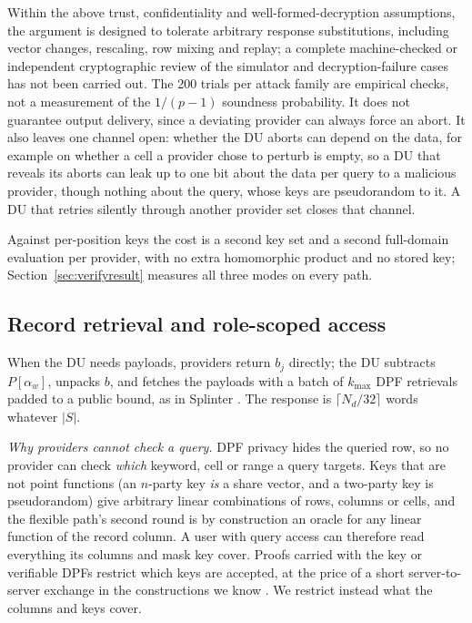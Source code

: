 \documentclass[a4paper,fleqn]{cas-sc}
\newif\ifauthorchecks
\newcommand{\authorcheck}[1]{\ifauthorchecks{\color{red}\textsf{[Authors: #1]}}\fi}
\begin{document}
Within the above trust, confidentiality and well-formed-decryption
assumptions, the argument is designed to tolerate arbitrary response
substitutions, including vector changes, rescaling, row mixing and replay;
a complete machine-checked or independent cryptographic review of the
simulator and decryption-failure cases has not been carried out. The 200
trials per attack family are empirical checks, not a measurement of the
$1/(p-1)$ soundness probability. It does not guarantee output
delivery, since a deviating provider can always force an abort. It also leaves
one channel open: whether the DU aborts can depend on the data, for example on
whether a cell a provider chose to perturb is empty, so a DU that reveals its
aborts can leak up to one bit about the data per query to a malicious
provider, though nothing about the query, whose keys are pseudorandom to it. A
DU that retries silently through another provider set closes that channel.
\authorcheck{Independent verification of the session-check reduction,
including computational DPF hybrids, the explicit output/decryption interface,
and adaptive abort leakage, is required before submission.}
Against per-position keys the cost is a second key set and a second full-domain
evaluation per provider, with no extra homomorphic product and no stored key;
Section~\ref{sec:verifyresult} measures all three modes on every path.

\subsection{Record retrieval and role-scoped access}
\label{sec:auth}
When the DU needs payloads, providers return $b_j$ directly; the DU subtracts
$P[\alpha_w]$, unpacks $b$, and fetches the payloads with a batch of
$k_{\max}$ DPF retrievals padded to a public bound, as in Splinter
\citep{splinter}. The response is $\lceil N_d/32\rceil$ words whatever $|S|$.

\emph{Why providers cannot check a query.} DPF privacy hides the queried row,
so no provider can check \emph{which} keyword, cell or range a query targets.
Keys that are not point functions (an $n$-party key \emph{is} a share vector,
and a two-party key is pseudorandom) give arbitrary linear combinations of
rows, columns or cells, and the flexible path's second round is by
construction an oracle for any linear function of the record column. A user
with query access can therefore read everything its columns and mask key
cover. Proofs carried with the key \citep{pacl,ji2023finegrained} or verifiable
DPFs \citep{decastro2022lightweight} restrict which keys are accepted, at the
price of a short server-to-server exchange in the constructions we know
\citep{boneh2021lightweight}. We restrict instead what the columns and keys
cover.
\end{document}

